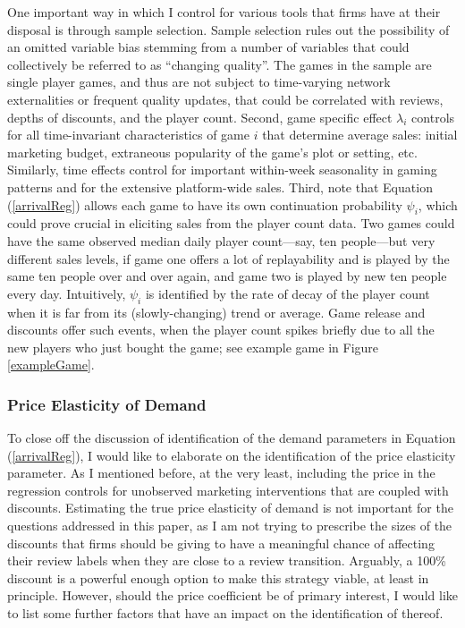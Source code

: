\documentclass[12pt,pagebackref]{article}
\begin{document}
One important way in which I control for various tools that firms have
at their disposal is through sample selection. Sample selection rules
out the possibility of an omitted variable bias stemming from a number
of variables that could collectively be referred to as ``changing
quality''. The games in the sample are single player games, and thus are
not subject to time-varying network externalities or frequent quality
updates, that could be correlated with reviews, depths of discounts, and
the player count. Second, game specific effect \(\lambda_i\) controls
for all time-invariant characteristics of game \(i\) that determine
average sales: initial marketing budget, extraneous popularity of the
game's plot or setting, etc. Similarly, time effects control for
important within-week seasonality in gaming patterns and for the
extensive platform-wide sales. Third, note that Equation
(\ref{arrivalReg}) allows each game to have its own continuation
probability \(\psi_i\), which could prove crucial in eliciting sales
from the player count data. Two games could have the same observed
median daily player count---say, ten people---but very different sales
levels, if game one offers a lot of replayability and is played by the
same ten people over and over again, and game two is played by new ten
people every day. Intuitively, \(\psi_i\) is identified by the rate of
decay of the player count when it is far from its (slowly-changing)
trend or average. Game release and discounts offer such events, when the
player count spikes briefly due to all the new players who just bought
the game; see example game in Figure \ref{exampleGame}.

\hypertarget{price-elasticity-of-demand}{%
\subsubsection{Price Elasticity of
Demand}\label{price-elasticity-of-demand}}

To close off the discussion of identification of the demand parameters
in Equation (\ref{arrivalReg}), I would like to elaborate on the
identification of the price elasticity parameter. As I mentioned before,
at the very least, including the price in the regression controls for
unobserved marketing interventions that are coupled with discounts.
Estimating the true price elasticity of demand is not important for the
questions addressed in this paper, as I am not trying to prescribe the
sizes of the discounts that firms should be giving to have a meaningful
chance of affecting their review labels when they are close to a review
transition. Arguably, a 100\% discount is a powerful enough option to
make this strategy viable, at least in principle. However, should the
price coefficient be of primary interest, I would like to list some
further factors that have an impact on the identification of thereof.
\end{document}
